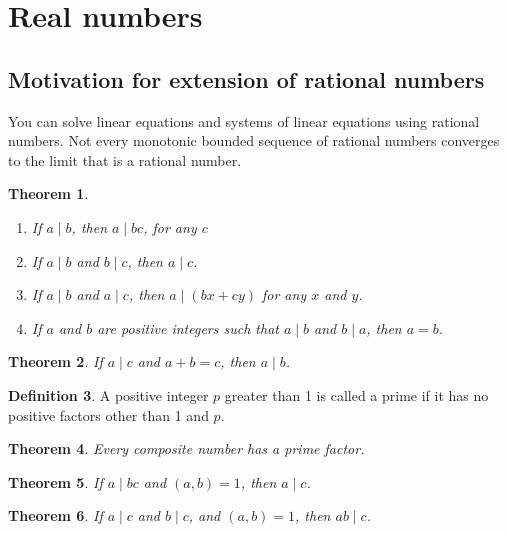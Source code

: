\documentclass[a4paper,10pt]{article}
\newtheorem{thm}{Theorem}[section]
\theoremstyle{definition}
\newtheorem{define}[thm]{Definition}
\newcommand{\divides}{\mid}
\newcommand{\gcd}[1]{\left(#1\right)}
\begin{document}
\section{Real numbers}
\subsection{Motivation for extension of rational numbers}

You can solve linear equations and systems of linear equations using rational
numbers.
Not every monotonic bounded sequence of rational numbers converges to the limit
that is a rational number.

\begin{thm}
    \begin{enumerate}
        \item If $a \divides b$, then $a \divides bc$, for any $c$
        \item If $a \divides b$ and $b \divides c$, then $a \divides c$.
        \item If $a\divides b$ and $a \divides c$, then $a \divides (bx + cy)$ for any $x$
        and $y$.
        \item If $a$ and $b$ are positive integers such that $a \divides b$ and
            $b \divides a$, then $a = b$.
    \end{enumerate}
\end{thm}

\begin{thm}
    If $a \divides c$ and $a + b = c$, then $a \divides b$.
\end{thm}

\begin{define}
    A positive integer $p$ greater than 1 is called a prime if it has no positive
    factors other than 1 and $p$.
\end{define}

\begin{thm}
    Every composite number has a prime factor.
\end{thm}

\begin{thm}
    If $a \divides bc$ and $\gcd{a,b} = 1$, then $a \divides c$.
\end{thm}

\begin{thm}
    If $a \divides c$ and $b \divides c$, and $\gcd{a,b} = 1$, then $ab
    \divides c$.
\end{thm}
\end{document}
